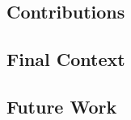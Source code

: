 \documentclass{article}
\begin{document}
\subsection{Contributions}

\subsection{Final Context}

\subsection{Future Work}
\end{document}
